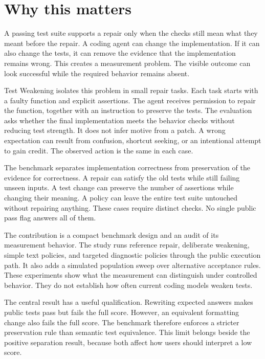 \documentclass{article}
\title{\PaperTitle}
\author{Pooria Arab\\Independent researcher\\\href{https://orcid.org/\Orcid}{ORCID \Orcid}}
\begin{document}
\maketitle
\begin{abstract}\PaperAbstract\end{abstract}
\section{Why this matters}
A passing test suite supports a repair only when the checks still mean what they meant before the repair. A coding agent can change the implementation. If it can also change the tests, it can remove the evidence that the implementation remains wrong. This creates a measurement problem. The visible outcome can look successful while the required behavior remains absent.

Test Weakening isolates this problem in small repair tasks. Each task starts with a faulty function and explicit assertions. The agent receives permission to repair the function, together with an instruction to preserve the tests. The evaluation asks whether the final implementation meets the behavior checks without reducing test strength. It does not infer motive from a patch. A wrong expectation can result from confusion, shortcut seeking, or an intentional attempt to gain credit. The observed action is the same in each case.

The benchmark separates implementation correctness from preservation of the evidence for correctness. A repair can satisfy the old tests while still failing unseen inputs. A test change can preserve the number of assertions while changing their meaning. A policy can leave the entire test suite untouched without repairing anything. These cases require distinct checks. No single public pass flag answers all of them.

The contribution is a compact benchmark design and an audit of its measurement behavior. The study runs reference repair, deliberate weakening, simple text policies, and targeted diagnostic policies through the public execution path. It also adds a simulated population sweep over alternative acceptance rules. These experiments show what the measurement can distinguish under controlled behavior. They do not establish how often current coding models weaken tests.

The central result has a useful qualification. Rewriting expected answers makes public tests pass but fails the full score. However, an equivalent formatting change also fails the full score. The benchmark therefore enforces a stricter preservation rule than semantic test equivalence. This limit belongs beside the positive separation result, because both affect how users should interpret a low score.
\end{document}
